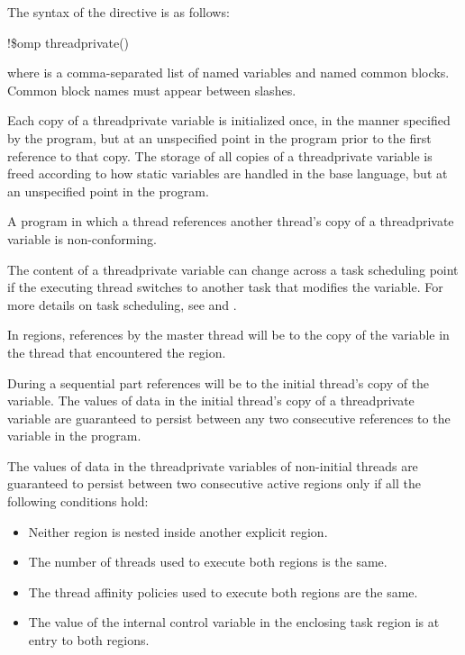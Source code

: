 \fortranspecificstart
The syntax of the  directive is as follows:

\begin{boxedcode}
!\$omp threadprivate()
\end{boxedcode}

where  is a comma-separated list of named variables and named common blocks. 
Common block names must appear between slashes.
\fortranspecificend

\descr
Each copy of a threadprivate variable is initialized once, in the manner specified by the 
program, but at an unspecified point in the program prior to the first reference to that 
copy. The storage of all copies of a threadprivate variable is freed according to how 
static variables are handled in the base language, but at an unspecified point in the 
program.

A program in which a thread references another thread’s copy of a threadprivate variable 
is non-conforming.

The content of a threadprivate variable can change across a task scheduling point if the 
executing thread switches to another task that modifies the variable. For more details on 
task scheduling, see 
 and 
.

In  regions, references by the master thread will be to the copy of the 
variable in the thread that encountered the  region. 

During a sequential part references will be to the initial thread’s copy of the variable. 
The values of data in the initial thread’s copy of a threadprivate variable are guaranteed 
to persist between any two consecutive references to the variable in the program. 

The values of data in the threadprivate variables of non-initial threads are guaranteed to 
persist between two consecutive active  regions only if all the following 
conditions hold:

\begin{itemize}  %
\item Neither  region is nested inside another explicit  region. 

\item The number of threads used to execute both  regions is the same. 

\item The thread affinity policies used to execute both  regions are the same. 

\item The value of the  internal control variable in the enclosing task region is  
at entry to both  regions.
\end{itemize} %

